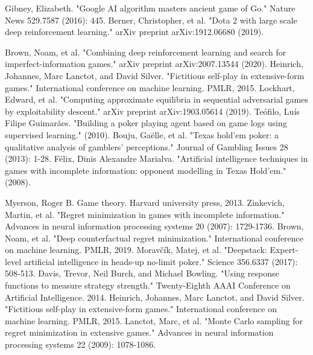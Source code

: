 \documentclass[12pt,oneside,a4paper]{report}
\begin{document}
\begin{thebibliography}{100}
    Gibney, Elizabeth. "Google AI algorithm masters ancient game of Go." Nature News 529.7587 (2016): 445.
    Berner, Christopher, et al. "Dota 2 with large scale deep reinforcement learning." arXiv preprint arXiv:1912.06680 (2019).

    Brown, Noam, et al. "Combining deep reinforcement learning and search for imperfect-information games." arXiv preprint arXiv:2007.13544 (2020).
    Heinrich, Johannes, Marc Lanctot, and David Silver. "Fictitious self-play in extensive-form games." International conference on machine learning. PMLR, 2015.
    Lockhart, Edward, et al. "Computing approximate equilibria in sequential adversarial games by exploitability descent." arXiv preprint arXiv:1903.05614 (2019).
    Teófilo, Luís Filipe Guimarães. "Building a poker playing agent based on game logs using supervised learning." (2010).
    Bouju, Gaëlle, et al. "Texas hold'em poker: a qualitative analysis of gamblers' perceptions." Journal of Gambling Issues 28 (2013): 1-28.
    Félix, Dinis Alexandre Marialva. "Artificial intelligence techniques in games with incomplete information: opponent modelling in Texas Hold'em." (2008).

    Myerson, Roger B. Game theory. Harvard university press, 2013.
    Zinkevich, Martin, et al. "Regret minimization in games with incomplete information." Advances in neural information processing systems 20 (2007): 1729-1736.
    Brown, Noam, et al. "Deep counterfactual regret minimization." International conference on machine learning. PMLR, 2019. 
    Moravčík, Matej, et al. "Deepstack: Expert-level artificial intelligence in heads-up no-limit poker." Science 356.6337 (2017): 508-513. 
    Davis, Trevor, Neil Burch, and Michael Bowling. "Using response functions to measure strategy strength." Twenty-Eighth AAAI Conference on Artificial Intelligence. 2014. 
    Heinrich, Johannes, Marc Lanctot, and David Silver. "Fictitious self-play in extensive-form games." International conference on machine learning. PMLR, 2015. 
    Lanctot, Marc, et al. "Monte Carlo sampling for regret minimization in extensive games." Advances in neural information processing systems 22 (2009): 1078-1086.
\end{thebibliography}
\end{document}
